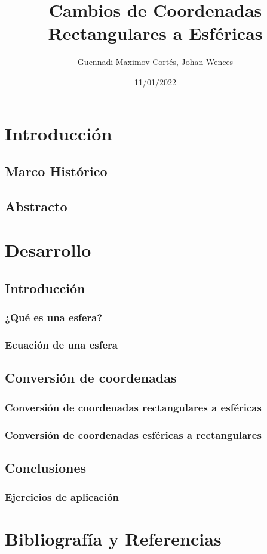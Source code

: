 \documentclass[letterpaper,14pt]{extreport} %
\title{Cambios de Coordenadas Rectangulares a Esféricas} %
\author{Guennadi Maximov Cortés, Johan Wences} %
\date{11/01/2022} %
\begin{document}
  \maketitle
  \tableofcontents
  \newpage

  \section{Introducción}
    \subsection{Marco Histórico}
    \subsection{Abstracto}
  \section{Desarrollo}
    \subsection{Introducción}
      \subsubsection{¿Qué es una esfera?}
      \subsubsection{Ecuación de una esfera}
    \subsection{Conversión de coordenadas}
       \subsubsection{Conversión de coordenadas rectangulares a esféricas}
       \subsubsection{Conversión de coordenadas esféricas a rectangulares}
    \subsection{Conclusiones}
      \subsubsection{Ejercicios de aplicación}
  \section{Bibliografía y Referencias}
\end{document}
